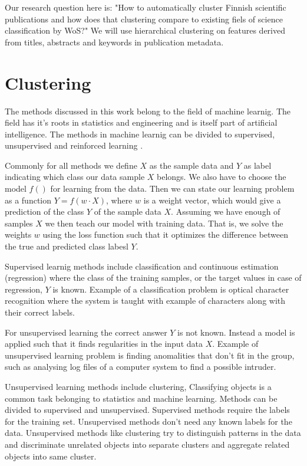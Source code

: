 Our research question here is: "How to automatically cluster 
Finnish scientific publications and how does that clustering 
compare to existing fiels of science classification by WoS?" We 
will use hierarchical clustering on features derived from titles,
abstracts and keywords in publication metadata.


\section{Clustering}
The methods discussed in this work belong to the field of machine 
learnig. The field has it's roots in statistics and engineering 
and is itself part of artificial intelligence.
The methods in machine learnig can be divided to supervised, 
unsupervised and reinforced learning \cite{alpaydin2004introduction}.

Commonly for all methods we define $X$ as
the sample data and $Y$ as label indicating which class our data 
sample $X$ belongs. We also have to choose the model $f()$ for
learning from the data. Then we can state our learning problem as
a function $Y = f(w \cdot X)$, where $w$ is a weight vector, 
which would give a prediction of the class $Y$ of the sample data
$X$. 
Assuming we have enough of samples $X$ we then teach our model 
with training data. That is, we solve the weights $w$ using the
loss function such that it optimizes the difference between the 
true and predicted class labesl $Y$.

Supervised learnig methods include classification and continuous 
estimation (regression)
where the class of the training samples, or the target values in 
case of regression, $Y$ is known. Example of a classification 
problem is optical character recognition where the system is 
taught with example of characters along with their correct labels.

For unsupervised learning the correct answer $Y$ is not known. 
Instead a model is applied such that it finds regularities in the
input data $X$. Example of unsupervised learning problem is 
finding anomalities that don't fit in the group, such as analysing
log files of a computer system to find a possible intruder.

Unsupervised learning methods include clustering, 
Classifying objects is a common task belonging to statistics and 
machine learning. Methods can be divided to supervised and 
unsupervised. Supervised methods require the labels for the training
set. Unsupervised methods don't need any known labels for the data.
Unsupervised methods like clustering try to distinguish patterns 
in the data and discriminate unrelated objects into separate 
clusters and aggregate related objects into same cluster.

